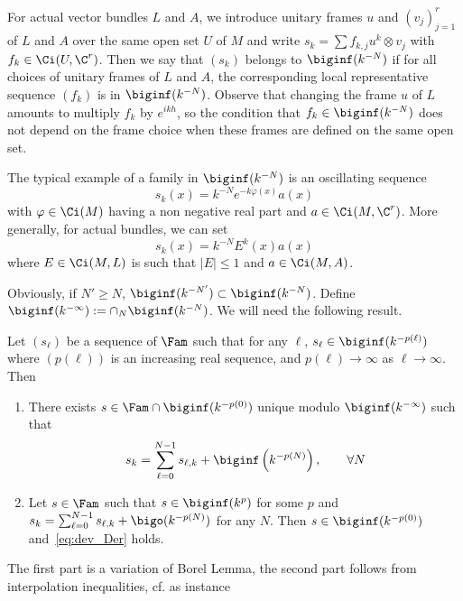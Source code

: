 For actual vector bundles $L$ and $A$, we introduce unitary frames $u$ and $(v_j)_{j=1}^{r}$ of $L$ and $A$ over the same open set $U$ of $M$ and write $s_k = \sum f_{k,j} u^k
\otimes v_j$ with $f_{k} \in \Ci (U, \C^r)$. Then we say that $(s_k)$ belongs to $\biginf (k^{-N})$ if for all choices of unitary frames of $L$ and $A$, the corresponding local representative sequence $(f_k)$ is in $\biginf(k^{-N})$. Observe that changing the frame $u$ of $L$ amounts to multiply $f_k$ by $e^{ikh}$, so the condition that $f_k \in \biginf (k^{-N})$ does not depend on the frame choice when these frames are defined on the same open set.

The typical example of a family in $\biginf (k^{-N})$ is an oscillating sequence
\[
s_k (x) = k^{-N}
e^{-k \varphi (x) } a (x)
\]
with $ \varphi \in \Ci (M)$ having a non negative real part and $a \in \Ci (M, \C^r)$. More generally, for actual bundles, we can set
\[
s_k (x)
= k^{-N} E^k(x) a(x)
\]
where $E \in \Ci (M, L)$ is such that $|E|\leqslant 1$ and $a
\in \Ci (M, A)$.


Obviously, if $N' \geqslant N$, $\biginf (k^{-N'}) \subset \biginf (k^{-N})$. Define $\biginf (k^{-\infty}) := \cap_N \biginf (k^{-N})$. We will need the following result.


\begin{lemm}\label{lem:dev_der_bor}
Let $(s_\ell)$ be a sequence of $\Fam$ such that for any $\ell$, $s_{\ell} \in
\biginf (k^{-p(\ell)}) $ where $(p(\ell))$ is an increasing real sequence, and $p(\ell)
\rightarrow \infty$ as $\ell \rightarrow \infty$. Then
\begin{enumerate}
\item There exists $s \in \Fam \cap \biginf (k^{-p(0)})$ unique modulo $\biginf (k^{-\infty})$ such that
\begin{gather}\label{eq:dev_Der}
s_k = \sum_{\ell =0}^{N-1} s_{\ell,k} + \biginf \left(k^{-p(N)}\right), \qquad
\forall N
\end{gather}
\item Let $s \in \Fam$ such that $s \in \biginf (k^{p})$ for some $p$ and $s_k =
\sum_{\ell =0}^{N-1} s_{\ell,k} + \bigo (k^{-p(N)})$ for any $N$. Then $s
\in \biginf (k^{-p(0)})$ and~\eqref{eq:dev_Der} holds.
\end{enumerate}
\end{lemm}

The first part is a variation of Borel Lemma, the second part follows from interpolation inequalities, cf. as instance~\cite[Lemma~32.]{Shubin}

